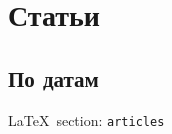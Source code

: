  
 

\part{Статьи}
\label{sec:articles}
\chapter{По датам}
  
\vspace{0.5cm}
\LaTeX~section: \verb|articles|
\vspace{0.5cm}



